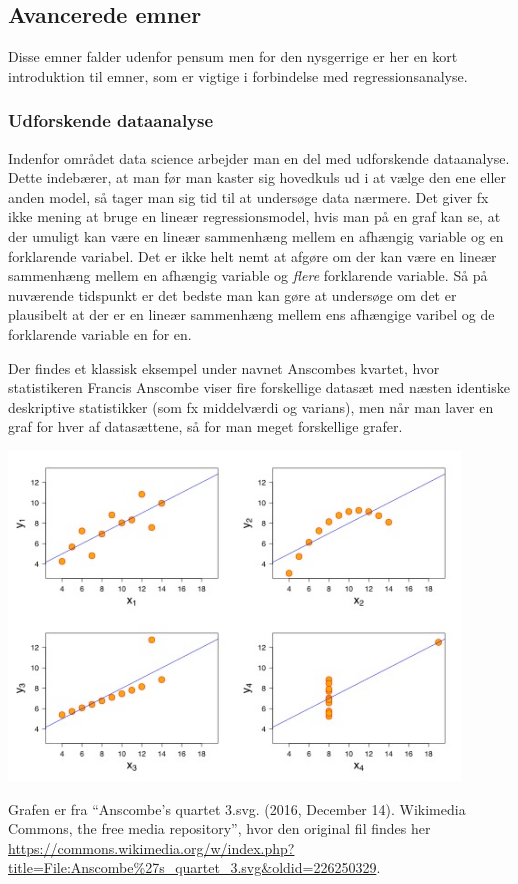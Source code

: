 \subsection{Avancerede emner}
Disse emner falder udenfor pensum men for den nysgerrige er her en kort introduktion til emner, som er vigtige i forbindelse med regressionsanalyse.

\subsubsection{Udforskende dataanalyse}
Indenfor området data science arbejder man en del med udforskende dataanalyse. Dette indebærer, at man før man kaster sig hovedkuls ud i at vælge den ene eller anden model, så tager man sig tid til at undersøge data nærmere. Det giver fx ikke mening at bruge en lineær regressionsmodel, hvis man på en graf kan se, at der umuligt kan være en lineær sammenhæng mellem en afhængig variable og en forklarende variabel. Det er ikke helt nemt at afgøre om der kan være en lineær sammenhæng mellem en afhængig variable og \textit{flere} forklarende variable. Så på nuværende tidspunkt er det bedste man kan gøre at undersøge om det er plausibelt at der er en lineær sammenhæng mellem ens afhængige varibel og de forklarende variable en for en.

Der findes et klassisk eksempel under navnet Anscombes kvartet, hvor  statistikeren Francis Anscombe viser fire forskellige datasæt med næsten identiske deskriptive statistikker (som fx middelværdi og varians), men når man laver en graf for hver af datasættene, så for man meget forskellige grafer.
\begin{center}
\includegraphics[width=12cm]{regression/images/Anscombes.JPG}
\end{center}
Grafen er fra ``Anscombe's quartet 3.svg. (2016, December 14). Wikimedia Commons, the free media repository'', hvor den original fil findes her \url{https://commons.wikimedia.org/w/index.php?title=File:Anscombe%27s_quartet_3.svg&oldid=226250329}.

